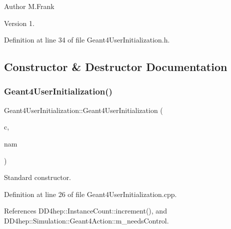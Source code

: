 \begin{DoxyAuthor}{Author}
M.\+Frank 
\end{DoxyAuthor}
\begin{DoxyVersion}{Version}
1. 
\end{DoxyVersion}


Definition at line 34 of file Geant4\+User\+Initialization.\+h.



\subsection{Constructor \& Destructor Documentation}
\hypertarget{class_d_d4hep_1_1_simulation_1_1_geant4_user_initialization_a0a36bf990b5b48d2436bed0dde12140d}{}\label{class_d_d4hep_1_1_simulation_1_1_geant4_user_initialization_a0a36bf990b5b48d2436bed0dde12140d} 
\subsubsection{\texorpdfstring{Geant4\+User\+Initialization()}{Geant4UserInitialization()}}
{\footnotesize\ttfamily Geant4\+User\+Initialization\+::\+Geant4\+User\+Initialization (\begin{DoxyParamCaption}\item[{\hyperlink{class_d_d4hep_1_1_simulation_1_1_geant4_context}{Geant4\+Context} $\ast$}]{c,  }\item[{const std\+::string \&}]{nam }\end{DoxyParamCaption})}



Standard constructor. 



Definition at line 26 of file Geant4\+User\+Initialization.\+cpp.



References D\+D4hep\+::\+Instance\+Count\+::increment(), and D\+D4hep\+::\+Simulation\+::\+Geant4\+Action\+::m\+\_\+needs\+Control.

\hypertarget{class_d_d4hep_1_1_simulation_1_1_geant4_user_initialization_af2367d3c7707179e2809f9a94b42bf00}{}\label{class_d_d4hep_1_1_simulation_1_1_geant4_user_initialization_af2367d3c7707179e2809f9a94b42bf00} 
